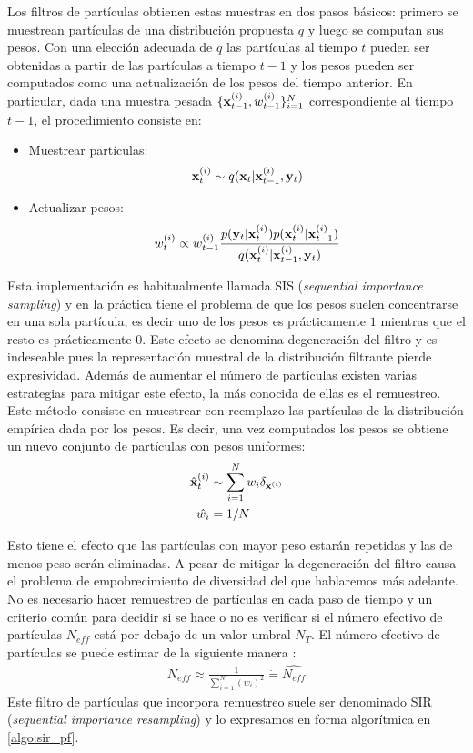 Los filtros de partículas obtienen estas muestras en dos pasos básicos: primero se muestrean partículas de una distribución propuesta $q$ y luego se computan sus pesos. Con una elección adecuada de $q$ las partículas al tiempo $t$ pueden ser obtenidas a partir de las partículas a tiempo $t-1$ y los pesos pueden ser computados como una actualización de los pesos del tiempo anterior. En particular, dada una muestra pesada $\{\mathbf{x}_{t-1}^{(i)}, w_{t-1}^{(i)}\}_{i=1}^{N}$ correspondiente al tiempo $t-1$, el procedimiento consiste en:
\begin{itemize}
    \item Muestrear partículas:
        \begin{align*}
            \mathbf{x}_{t}^{(i)} \sim q(\mathbf{x}_t | \mathbf{x}_{t-1}^{(i)}, \mathbf{y}_t)
        \end{align*}
    \item Actualizar pesos: 
        \begin{align*}
            w_{t}^{(i)} \propto w_{t-1}^{(i)} \frac{p(\mathbf{y}_t | \mathbf{x}_t^{(i)}) p(\mathbf{x}_t^{(i)} | \mathbf{x}_{t-1}^{(i)})}{q(\mathbf{x}_t^{(i)} | \mathbf{x}_{t-1}^{(i)}, \mathbf{y}_t)}
        \end{align*}
\end{itemize}

Esta implementación es habitualmente llamada SIS (\textit{sequential importance sampling}) y en la práctica tiene el problema de que los pesos suelen concentrarse en una sola partícula, es decir uno de los pesos es prácticamente $1$ mientras que el resto es prácticamente $0$. Este efecto se denomina degeneración del filtro y es indeseable pues la representación muestral de la distribución filtrante pierde expresividad. Además de aumentar el número de partículas existen varias estrategias para mitigar este efecto, la más conocida de ellas es el remuestreo. Este método consiste en muestrear con reemplazo las partículas de la distribución empírica dada por los pesos. Es decir, una vez computados los pesos se obtiene un nuevo conjunto de partículas con pesos uniformes:
\begin{align*}
    \hat{\mathbf{x}}_t^{(i)} &\sim \sum_{i=1}^N w_i \delta_{\mathbf{x}^{(i)}} \\
    \hat{w_i} &= 1 / N
\end{align*}

Esto tiene el efecto que las partículas con mayor peso estarán repetidas y las de menos peso serán eliminadas. A pesar de mitigar la degeneración del filtro causa el problema de empobrecimiento de diversidad del que hablaremos más adelante. No es necesario hacer remuestreo de partículas en cada paso de tiempo y un criterio común para decidir si se hace o no es verificar si el número efectivo de partículas $N_{eff}$ está por debajo de un valor umbral $N_T$. El número efectivo de partículas se puede estimar de la siguiente manera \citep{Liu1998}:
\begin{align*}
    N_{eff} \approx \frac{1}{\sum_{i=1}^N (w_i)^2} \dot{=} \widehat{N_{eff}}
\end{align*}
Este filtro de partículas que incorpora remuestreo suele ser denominado SIR (\textit{sequential importance resampling}) y lo expresamos en forma algorítmica en \ref{algo:sir_pf}.

